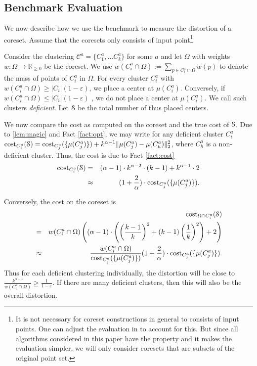 \subsection{Benchmark Evaluation}

We now describe how we use the benchmark to measure the distortion of a coreset. Assume that the coresets only consists of input point\footnote{It is not necessary for coreset constructions in general to consists of input points. One can adjust the evaluation in to account for this. But since all algorithms considered in this paper have the property and it makes the evaluation simpler, we will only consider coresets that are subsets of the original point set.}

Consider the clustering $\mathcal{C}^{a} = \{C_1^a,\ldots C_k^a\}$ for some $a$ and let $\Omega$ with weights $w:\Omega\rightarrow \mathbb{R}_{\geq 0}$ be the coreset. 
We use $w(C_i^a \cap \Omega):=\sum_{p\in C_i^a \cap \Omega} w(p)$ to denote the mass of points of $C_i^a$ in $\Omega$.
For every cluster $C_i^a$ with $w(C_i^a \cap \Omega)\geq |C_i| (1-\varepsilon)$, we place a center at $\mu(C_i^a)$. Conversely, if $w(C_i^a \cap \Omega)\leq |C_i| (1-\varepsilon)$ , we do not place a center at $\mu(C_i^a)$. We call such clusters \emph{deficient}. Let $\mathcal{S}$ be the total number of thus placed centers. 

We now compare the cost as computed on the coreset and the true cost of $\mathcal{S}$. Due to \cref{lem:magic} and Fact \ref{fact:opt}, we may write for any deficient cluster $C_i^a$
$\text{cost}_{C_i^a}(\mathcal{S}) = \text{cost}_{C_j^a}(\{\mu(C_j^a)\}) + k^{\alpha-1}\|\mu(C_j^a)-\mu(C_h^a)\|_2^2$, where $C_h^a$ is a non-deficient cluster.
Thus, the cost is due to Fact \ref{fact:cost}
\begin{eqnarray*}
\text{cost}_{C_i^a}(\mathcal{S}) &=& (\alpha-1)\cdot k^{\alpha-2}\cdot (k-1) + k^{\alpha-1}\cdot 2\\
&\approx & (1+\frac{2}{\alpha})\cdot \text{cost}_{C_j^a}(\{\mu(C_j^a)\}).
\end{eqnarray*}

Conversely, the cost on the coreset is
\begin{eqnarray*}
& &\text{cost}_{\Omega\cap C_i^a}(\mathcal{S})  \\
&= &w(C_i^a \cap \Omega)\left((\alpha-1)\cdot \left(\left(\frac{k-1}{k}\right)^2 + (k-1)\left(\frac{1}{k}\right)^2\right) + 2\right) \\
& \approx & \frac{w(C_i^a \cap \Omega)}{ \text{cost}_{C_j^a}(\{\mu(C_j^a)\})}(1+\frac{2}{\alpha})\cdot \text{cost}_{C_j^a}(\{\mu(C_j^a)\}).
\end{eqnarray*}
Thus for each deficient clustering individually, the distortion will be close to $\frac{k^{\alpha-1}}{w(C_i^a \cap \Omega)} \geq \frac{1}{1-\varepsilon}$.
If there are many deficient clusters, then this will also be the overall distortion.


